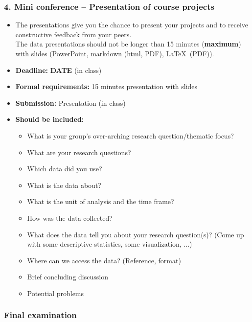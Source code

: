 \documentclass[12pt, a4paper]{article}
\begin{document}
\subsubsection*{4. Mini conference -- Presentation of course projects}
\begin{itemize}
\item[] \noindent The presentations give you the chance to present your projects and to receive constructive feedback from your peers.\\
The data presentations should not be longer than 15 minutes (\textbf{maximum}) with slides (PowerPoint, markdown (html, PDF), \LaTeX~(PDF)).
\item[] \textbf{Deadline:} \textbf{DATE} (in class)
\item[] \textbf{Formal requirements:} 15 minutes presentation with slides
\item[] \textbf{Submission:} Presentation (in-class)
\item[] \textbf{Should be included:}
\begin{itemize}
\item[-] What is your group's over-arching research question/thematic focus? 
\item[-] What are your research questions?
\item[-] Which data did you use?
\item[-] What is the data about?
\item[-] What is the unit of analysis and the time frame?
\item[-] How was the data collected?
\item[-] What does the data tell you about your research question(s)? (Come up with some descriptive statistics, some visualization, ...)
\item[-] Where can we access the data? (Reference, format) 
\item[-] Brief concluding discussion
\item[-] Potential problems
\end{itemize}
\end{itemize}

\newpage
\subsubsection*{Final examination}
\end{document}
